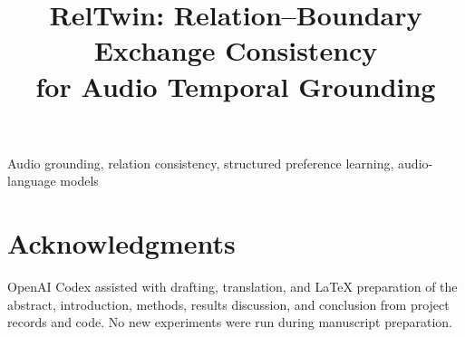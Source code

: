 \documentclass[10pt,letterpaper]{article}
\title{\fontsize{14}{16}\selectfont RelTwin: Relation--Boundary Exchange Consistency\\for Audio Temporal Grounding}
\begin{document}
\maketitle

\begin{keywords}
Audio grounding, relation consistency, structured preference learning, audio-language models
\end{keywords}









\section{Acknowledgments}
OpenAI Codex assisted with drafting, translation, and LaTeX preparation of the abstract, introduction, methods, results discussion, and conclusion from project records and code. No new experiments were run during manuscript preparation.
\clearpage
\balance


\end{document}
